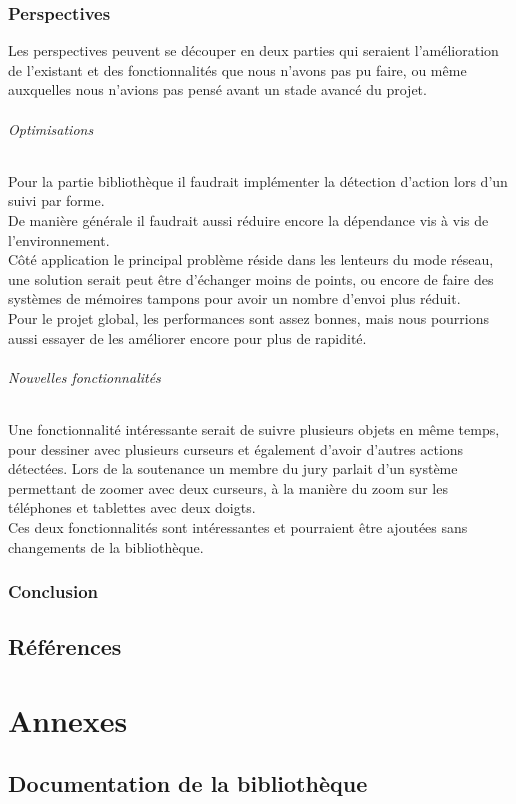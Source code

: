\documentclass{report}
\begin{document}
		\section{Perspectives}
		Les perspectives peuvent se découper en deux parties qui seraient l'amélioration de l'existant et des fonctionnalités que nous n'avons pas pu faire, ou même auxquelles nous n'avions pas pensé avant un stade avancé du projet. \\
		
		\paragraph{Optimisations}
		Pour la partie bibliothèque il faudrait implémenter la détection d'action lors d'un suivi par forme. \\
		De manière générale il faudrait aussi réduire encore la dépendance vis à vis de l'environnement. \\
		Côté application le principal problème réside dans les lenteurs du mode réseau, une solution serait peut être d'échanger moins de points, ou encore de faire des systèmes de mémoires tampons pour avoir un nombre d'envoi plus réduit. \\
		
		Pour le projet global, les performances sont assez bonnes, mais nous pourrions aussi essayer de les améliorer encore pour plus de rapidité. \\ 
		
		\paragraph{Nouvelles fonctionnalités}
		Une fonctionnalité intéressante serait de suivre plusieurs objets en même temps, pour dessiner avec plusieurs curseurs et également d'avoir d'autres actions détectées. Lors de la soutenance un membre du jury parlait d'un système permettant de zoomer avec deux curseurs, à la manière du zoom sur les téléphones et tablettes avec deux doigts. \\
Ces deux fonctionnalités sont intéressantes et pourraient être ajoutées sans changements de la bibliothèque. \\		
		\section{Conclusion}
	
	\chapter{Références}
	
	\part{Annexes}
	\appendix
		\chapter{Documentation de la bibliothèque}
		
\end{document}
